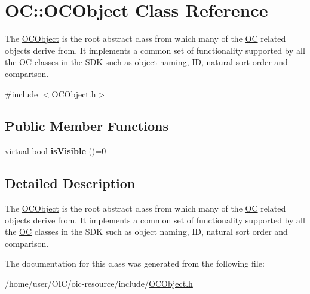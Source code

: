 \hypertarget{classOC_1_1OCObject}{}\section{O\+C\+:\+:O\+C\+Object Class Reference}
\label{classOC_1_1OCObject}


The \hyperlink{classOC_1_1OCObject}{O\+C\+Object} is the root abstract class from which many of the \hyperlink{namespaceOC}{O\+C} related objects derive from. It implements a common set of functionality supported by all the \hyperlink{namespaceOC}{O\+C} classes in the S\+D\+K such as object naming, I\+D, natural sort order and comparison.  




{\ttfamily \#include $<$O\+C\+Object.\+h$>$}

\subsection*{Public Member Functions}
\begin{DoxyCompactItemize}
\item 
\hypertarget{classOC_1_1OCObject_a67e15b0b14e4744665c75f1e1824eb08}{}virtual bool {\bfseries is\+Visible} ()=0\label{classOC_1_1OCObject_a67e15b0b14e4744665c75f1e1824eb08}

\end{DoxyCompactItemize}


\subsection{Detailed Description}
The \hyperlink{classOC_1_1OCObject}{O\+C\+Object} is the root abstract class from which many of the \hyperlink{namespaceOC}{O\+C} related objects derive from. It implements a common set of functionality supported by all the \hyperlink{namespaceOC}{O\+C} classes in the S\+D\+K such as object naming, I\+D, natural sort order and comparison. 

The documentation for this class was generated from the following file\+:\begin{DoxyCompactItemize}
\item 
/home/user/\+O\+I\+C/oic-\/resource/include/\hyperlink{OCObject_8h}{O\+C\+Object.\+h}\end{DoxyCompactItemize}
